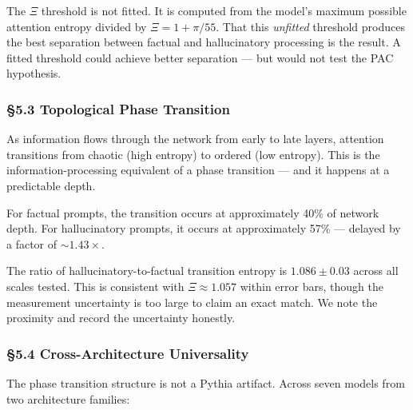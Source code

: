 \documentclass[
  11pt,
  a4paper]{article}
\begin{document}
The \(\Xi\) threshold is not fitted. It is computed from the model's
maximum possible attention entropy divided by \(\Xi = 1 + \pi/55\). That
this \emph{unfitted} threshold produces the best separation between
factual and hallucinatory processing is the result. A fitted threshold
could achieve better separation --- but would not test the PAC
hypothesis.

\subsubsection{§5.3 Topological Phase
Transition}\label{topological-phase-transition}

As information flows through the network from early to late layers,
attention transitions from chaotic (high entropy) to ordered (low
entropy). This is the information-processing equivalent of a phase
transition --- and it happens at a predictable depth.

For factual prompts, the transition occurs at approximately 40\% of
network depth. For hallucinatory prompts, it occurs at approximately
57\% --- delayed by a factor of \(\sim 1.43\times\).

The ratio of hallucinatory-to-factual transition entropy is
\(1.086 \pm 0.03\) across all scales tested. This is consistent with
\(\Xi \approx 1.057\) within error bars, though the measurement
uncertainty is too large to claim an exact match. We note the proximity
and record the uncertainty honestly.

\subsubsection{§5.4 Cross-Architecture
Universality}\label{cross-architecture-universality}

The phase transition structure is not a Pythia artifact. Across seven
models from two architecture families:
\end{document}
